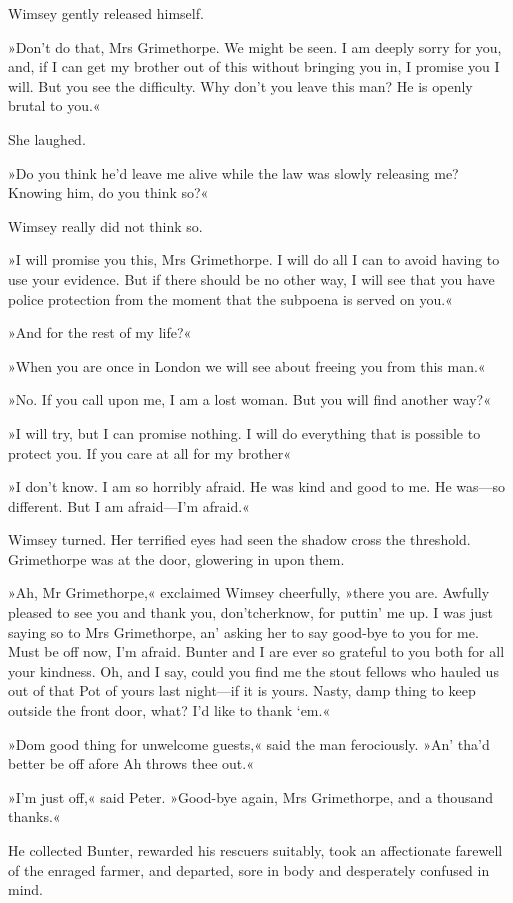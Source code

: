 Wimsey gently released himself.

»Don't do that, Mrs Grimethorpe. We might be seen. I am deeply sorry for you, and, if I can get my brother out of this without bringing you in, I promise you I will. But you see the difficulty. Why don't you leave this man? He is openly brutal to you.«

She laughed.

»Do you think he'd leave me alive while the law was slowly releasing me? Knowing him, do you think so?«

Wimsey really did not think so.

»I will promise you this, Mrs Grimethorpe. I will do all I can to avoid having to use your evidence. But if there should be no other way, I will see that you have police protection from the moment that the subpoena is served on you.«

»And for the rest of my life?«

»When you are once in London we will see about freeing you from this man.«

»No. If you call upon me, I am a lost woman. But you will find another way?«

»I will try, but I can promise nothing. I will do everything that is possible to protect you. If you care at all for my brother\longdash«

»I don't know. I am so horribly afraid. He was kind and good to me. He was—so different. But I am afraid—I'm afraid.«

Wimsey turned. Her terrified eyes had seen the shadow cross the threshold. Grimethorpe was at the door, glowering in upon them.

»Ah, Mr Grimethorpe,« exclaimed Wimsey cheerfully, »there you are.  Awfully pleased to see you and thank you, don'tcherknow, for puttin' me up. I was just saying so to Mrs Grimethorpe, an' asking her to say good-bye to you for me. Must be off now, I'm afraid. Bunter and I are ever so grateful to you both for all your kindness. Oh, and I say, could you find me the stout fellows who hauled us out of that Pot of yours last night—if it is yours. Nasty, damp thing to keep outside the front door, what? I'd like to thank `em.«

»Dom good thing for unwelcome guests,« said the man ferociously. »An' tha'd better be off afore Ah throws thee out.«

»I'm just off,« said Peter. »Good-bye again, Mrs Grimethorpe, and a thousand thanks.«

He collected Bunter, rewarded his rescuers suitably, took an affectionate farewell of the enraged farmer, and departed, sore in body and desperately confused in mind. 
